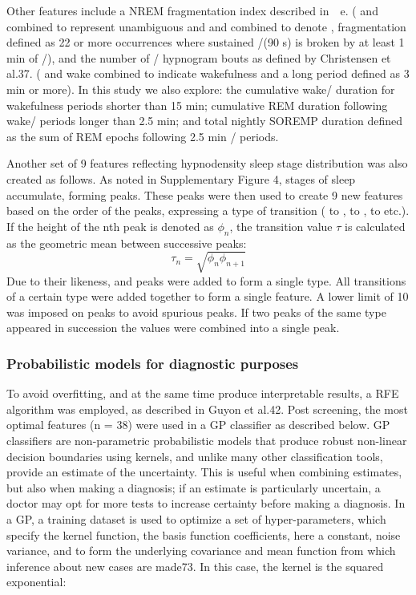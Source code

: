 Other features include a \ac{NREM} fragmentation index described in~\citeauthor{Christensen2015a}~\cite{Christensen2015a}e. (\nII{} and \nIII{} combined to represent unambiguous \nrem{} and \nI{} and \wake{} combined to denote \wake, \nrem{} fragmentation defined as 22 or more occurrences where sustained \nII/\nIII (90 s) is broken by at least 1 min of \nI/\wake), and the number of \wake/\nI{} hypnogram bouts as defined by Christensen et al.37. (\nI{} and wake combined to indicate wakefulness and a long period defined as 3 min or more).
In this study we also explore: the cumulative wake/\nI{} duration for wakefulness periods shorter than 15 min; cumulative REM duration following wake/\nI{} periods longer than 2.5 min; and total nightly SOREMP duration defined as the sum of REM epochs following 2.5 min \wake/\nI{} periods.

Another set of 9 features reflecting hypnodensity sleep stage distribution was also created as follows. 
As noted in Supplementary Figure 4, stages of sleep accumulate, forming peaks. 
These peaks were then used to create 9 new features based on the order of the peaks, expressing a type of transition (\wake{} to \nI{}, \wake{} to \rem{}, \rem{} to \nIII{} etc.). 
If the height of the nth peak is denoted as $\phi_n$, the transition value $\tau$ is calculated as the geometric mean between successive peaks:
\begin{equation}
    \tau_n = \sqrt{\phi_n \phi_{n+1}}
\end{equation}
Due to their likeness, \wake{} and \nI{} peaks were added to form a single type.
All transitions of a certain type were added together to form a single feature. A lower limit of 10 was imposed on peaks to avoid spurious peaks. If two peaks of the same type appeared in succession the values were combined into a single peak.


\subsubsection{Probabilistic models for diagnostic purposes} 
To avoid overfitting, and at the same time produce interpretable results, a RFE algorithm was employed, as described in Guyon et al.42.
Post screening, the most optimal features (n = 38) were used in a GP classifier as described below.
GP classifiers are non-parametric probabilistic models that produce robust non-linear decision boundaries using kernels, and unlike many other classification tools, provide an estimate of the uncertainty.
This is useful when combining estimates, but also when making a diagnosis; if an estimate is particularly uncertain, a doctor may opt for more tests to increase certainty before making a diagnosis.
In a GP, a training dataset is used to optimize a set of hyper-parameters, which specify the kernel function, the basis function coefficients, here a constant, noise variance, and to form the underlying covariance and mean function from which inference about new cases are made73.
In this case, the kernel is the squared exponential:

